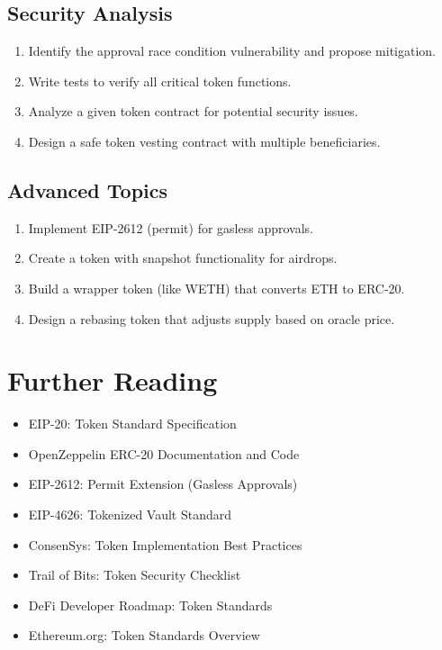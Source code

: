 \documentclass[11pt,a4paper]{article}
\begin{document}
\subsection{Security Analysis}

\begin{enumerate}
  \item Identify the approval race condition vulnerability and propose mitigation.
  \item Write tests to verify all critical token functions.
  \item Analyze a given token contract for potential security issues.
  \item Design a safe token vesting contract with multiple beneficiaries.
\end{enumerate}

\subsection{Advanced Topics}

\begin{enumerate}
  \item Implement EIP-2612 (permit) for gasless approvals.
  \item Create a token with snapshot functionality for airdrops.
  \item Build a wrapper token (like WETH) that converts ETH to ERC-20.
  \item Design a rebasing token that adjusts supply based on oracle price.
\end{enumerate}

\section{Further Reading}

\begin{itemize}
  \item EIP-20: Token Standard Specification
  \item OpenZeppelin ERC-20 Documentation and Code
  \item EIP-2612: Permit Extension (Gasless Approvals)
  \item EIP-4626: Tokenized Vault Standard
  \item ConsenSys: Token Implementation Best Practices
  \item Trail of Bits: Token Security Checklist
  \item DeFi Developer Roadmap: Token Standards
  \item Ethereum.org: Token Standards Overview
\end{itemize}
\end{document}
